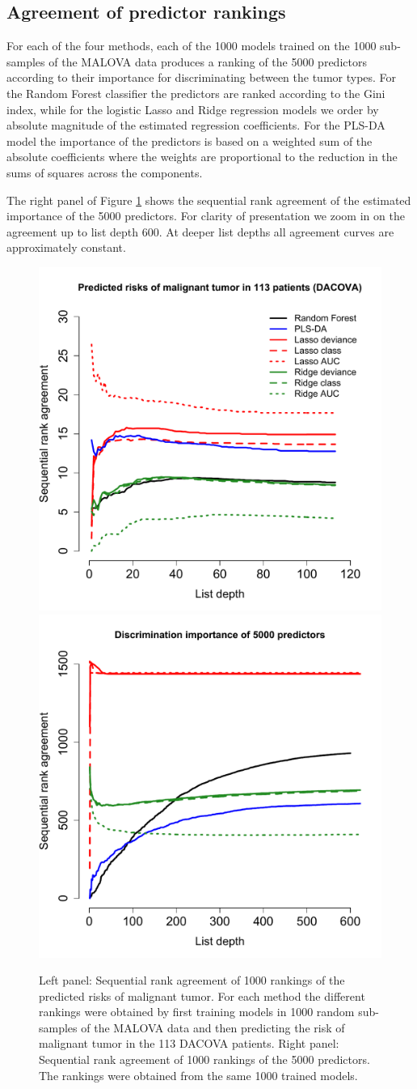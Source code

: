 \documentclass[12pt,a4paper]{article}
\theoremstyle{plain}
\begin{document}
\subsection{Agreement of predictor rankings}
For each of the four methods, each of the 1000 models trained on
the 1000 sub-samples of the MALOVA data produces a ranking of the 5000
predictors according to their importance for discriminating between
the tumor types. For the Random Forest classifier the predictors are ranked according
to the Gini index, while for the logistic Lasso and Ridge regression
models we order by absolute magnitude of the estimated
regression coefficients. For the PLS-DA model the importance of the
predictors is based on a weighted sum of the absolute coefficients
where the weights are proportional to the reduction in the sums of
squares across the components.

The right panel of Figure \ref{fig:app1} shows the sequential rank
agreement of the estimated importance of the 5000 predictors.  For
clarity of presentation we zoom in on the agreement up to list depth
600. At deeper list depths all agreement curves are approximately constant.


\begin{figure}[htbp]
\begin{center}
\includegraphics[width=.49\textwidth]{pics/riskAgreementPlot}%
\includegraphics[width=.49\textwidth]{pics/predictorAgreementPlot}
\end{center}
\caption{Left panel: Sequential rank agreement of 1000 rankings of the
  predicted risks of malignant tumor. For each method the different
  rankings were obtained by first training models in 1000 random
  sub-samples of the MALOVA data and then predicting the risk of
  malignant tumor in the 113 DACOVA patients. Right panel: Sequential
  rank agreement of 1000 rankings of the 5000 predictors. The rankings
  were obtained from the same 1000 trained models.}
 \label{fig:app1}
\end{figure}
\end{document}
